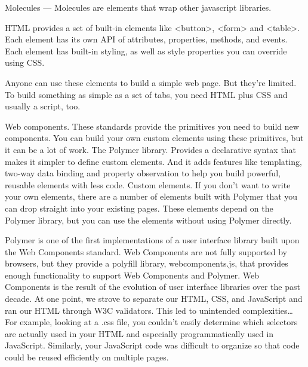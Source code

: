 \item Molecules — Molecules are elements that wrap other javascript libraries.

HTML provides a set of built-in elements like <button>, <form> and <table>. Each element has its own API of attributes, properties, methods, and events. Each element has built-in styling, as well as style properties you can override using CSS.

Anyone can use these elements to build a simple web page. But they’re limited. To build something as simple as a set of tabs, you need HTML plus CSS and usually a script, too.

Web components. These standards provide the primitives you need to build new components. You can build your own custom elements using these primitives, but it can be a lot of work.
The Polymer library. Provides a declarative syntax that makes it simpler to define custom elements. And it adds features like templating, two-way data binding and property observation to help you build powerful, reusable elements with less code.
Custom elements. If you don’t want to write your own elements, there are a number of elements built with Polymer that you can drop straight into your existing pages. These elements depend on the Polymer library, but you can use the elements without using Polymer directly.

Polymer is one of the first implementations of a user interface library built upon the Web Components standard.  Web Components are not fully supported by browsers, but they provide a polyfill library, webcomponents.js, that provides enough functionality to support Web Components and Polymer.
Web Components is the result of the evolution of user interface libraries over the past decade.  At one point, we strove to separate our HTML, CSS, and JavaScript and ran our HTML through W3C validators. This led to unintended complexities…  For example, looking at a .css file, you couldn’t easily determine which selectors are actually used in your HTML and especially programmatically used in JavaScript.  Similarly, your JavaScript code was difficult to organize so that code could be reused efficiently on multiple pages.
